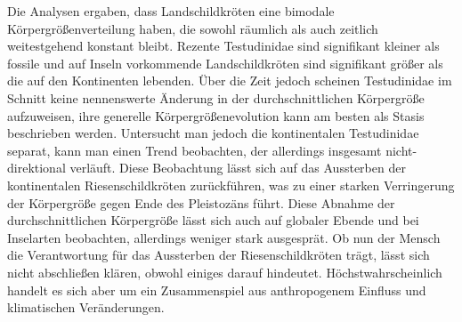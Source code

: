 Die Analysen ergaben, dass Landschildkröten eine bimodale Körpergrößenverteilung haben, die sowohl räumlich als auch zeitlich weitestgehend konstant bleibt. Rezente Testudinidae sind signifikant kleiner als fossile und auf Inseln vorkommende
Landschildkröten sind signifikant größer als die auf den Kontinenten lebenden.
Über die Zeit jedoch scheinen Testudinidae im Schnitt keine nennenswerte Änderung in der durchschnittlichen Körpergröße aufzuweisen, ihre generelle Körpergrößenevolution kann am besten als Stasis beschrieben werden.
Untersucht man jedoch die kontinentalen Testudinidae separat, kann man einen Trend beobachten, der allerdings insgesamt nicht-direktional verläuft. Diese Beobachtung lässt sich auf das Aussterben der kontinentalen Riesenschildkröten zurückführen, was zu einer starken Verringerung der Körpergröße gegen Ende des Pleistozäns führt.
Diese Abnahme der durchschnittlichen Körpergröße lässt sich auch auf globaler Ebende und bei Inselarten beobachten, allerdings weniger stark ausgesprät.
Ob nun der Mensch die Verantwortung für das Aussterben der Riesenschildkröten trägt, lässt sich nicht abschließen klären, obwohl einiges darauf hindeutet. Höchstwahrscheinlich handelt es sich aber um ein Zusammenspiel aus anthropogenem Einfluss und klimatischen Veränderungen.



